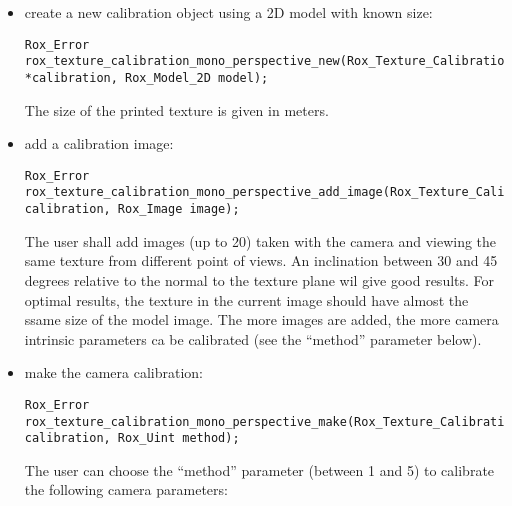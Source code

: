 \begin{itemize}
\item create a new calibration object using a 2D model with known size:

\begin{lstlisting}
Rox_Error rox_texture_calibration_mono_perspective_new(Rox_Texture_Calibration_Mono_Perspective *calibration, Rox_Model_2D model);
\end{lstlisting}

The size of the printed texture is given in meters.

\item add a calibration image:
 
\begin{lstlisting}
Rox_Error rox_texture_calibration_mono_perspective_add_image(Rox_Texture_Calibration_Mono_Perspective calibration, Rox_Image image);
\end{lstlisting}

The user shall add images (up to 20) taken with the camera and viewing
the same texture from different point of views. An inclination between
30 and 45 degrees relative to the normal to the texture plane wil
give good results. For optimal results, the texture in the current
image should have almost the ssame size of the model image. The more
images are added, the more camera intrinsic parameters ca be
calibrated (see the ``method'' parameter below).

\item make the camera calibration:
 
\begin{lstlisting}
Rox_Error rox_texture_calibration_mono_perspective_make(Rox_Texture_Calibration_Mono_Perspective calibration, Rox_Uint method);
\end{lstlisting}

The user can choose the ``method'' parameter (between 1 and 5) to calibrate the following camera parameters:


\end{itemize}
